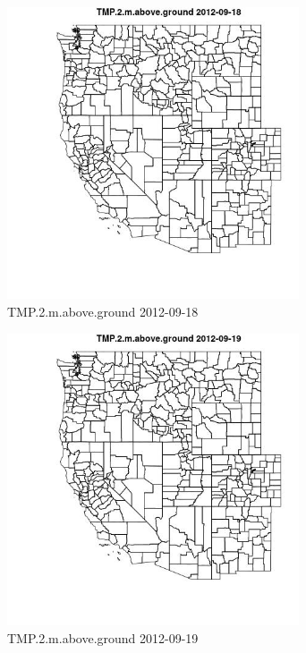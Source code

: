 \begin{figure} 
\centering  
\includegraphics[width=0.77\textwidth]{Code_Outputs/ML_input_report_ML_input_PM25_Step5_part_d_de_duplicated_aves_ML_input_MapObsTMP2maboveground2012-09-18.jpg} 
\caption{\label{fig:ML_input_report_ML_input_PM25_Step5_part_d_de_duplicated_aves_ML_inputMapObsTMP2maboveground2012-09-18}TMP.2.m.above.ground 2012-09-18} 
\end{figure} 
 

\begin{figure} 
\centering  
\includegraphics[width=0.77\textwidth]{Code_Outputs/ML_input_report_ML_input_PM25_Step5_part_d_de_duplicated_aves_ML_input_MapObsTMP2maboveground2012-09-19.jpg} 
\caption{\label{fig:ML_input_report_ML_input_PM25_Step5_part_d_de_duplicated_aves_ML_inputMapObsTMP2maboveground2012-09-19}TMP.2.m.above.ground 2012-09-19} 
\end{figure} 
 


